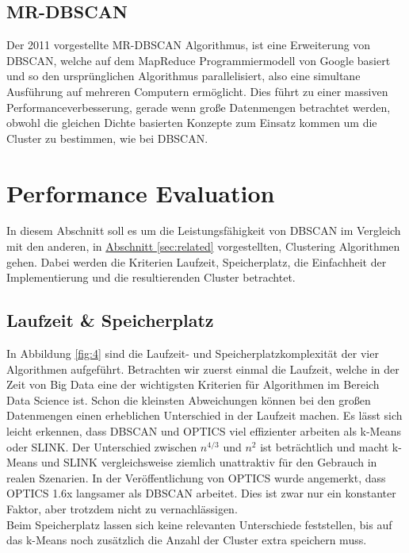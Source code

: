 \documentclass{lni}
\begin{document}

\subsection{MR-DBSCAN}
Der 2011 vorgestellte MR-DBSCAN \cite{PARALLEL} Algorithmus, ist eine Erweiterung von DBSCAN, welche auf dem MapReduce \cite{MAPREDUCE} Programmiermodell von Google basiert und so den ursprünglichen Algorithmus parallelisiert, also eine simultane Ausführung auf mehreren Computern ermöglicht. Dies führt zu einer massiven Performanceverbesserung, gerade wenn große Datenmengen betrachtet werden, obwohl die gleichen Dichte basierten Konzepte zum Einsatz kommen um die Cluster zu bestimmen, wie bei DBSCAN. 

%
%

\section{Performance Evaluation}
\label{sec:perf}
In diesem Abschnitt soll es um die Leistungsfähigkeit von DBSCAN im Vergleich mit den anderen, in \hyperref[sec:related]{Abschnitt \ref{sec:related}} vorgestellten, Clustering Algorithmen gehen. Dabei werden die Kriterien Laufzeit, Speicherplatz, die Einfachheit der Implementierung und die resultierenden Cluster betrachtet.


\subsection{Laufzeit \& Speicherplatz}

In Abbildung \ref{fig:4} sind die Laufzeit- und Speicherplatzkomplexität der vier Algorithmen aufgeführt. Betrachten wir zuerst einmal die Laufzeit, welche in der Zeit von Big Data eine der wichtigsten Kriterien für Algorithmen im Bereich Data Science ist. Schon die kleinsten Abweichungen können bei den großen Datenmengen einen erheblichen Unterschied in der Laufzeit machen.
Es lässt sich leicht erkennen, dass DBSCAN und OPTICS viel effizienter arbeiten als k-Means oder SLINK. Der Unterschied zwischen $n^{4/3}$ \cite{REV} \cite{REVREV} und $n^2$ ist beträchtlich und macht k-Means und SLINK vergleichsweise ziemlich unattraktiv für den Gebrauch in realen Szenarien. In der Veröffentlichung von OPTICS \cite{OPTICS} wurde angemerkt, dass OPTICS 1.6x langsamer als DBSCAN arbeitet. Dies ist zwar nur ein konstanter Faktor, aber trotzdem nicht zu vernachlässigen.\\
Beim Speicherplatz lassen sich keine relevanten Unterschiede feststellen, bis auf das k-Means noch zusätzlich die Anzahl der Cluster extra speichern muss.\\
\end{document}
